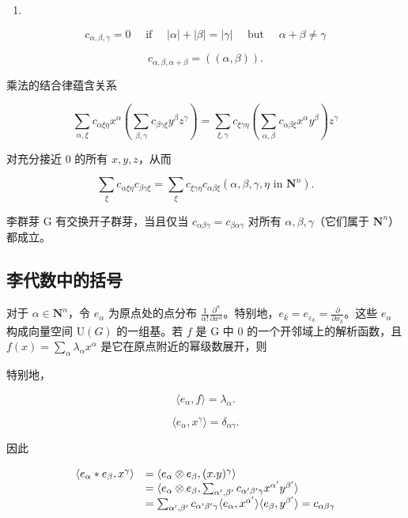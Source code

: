 \begin{enumerate}
\def\labelenumi{(\arabic{enumi})}
\setcounter{enumi}{7}
\tightlist
\item
\end{enumerate}

\[
c _ {\alpha , \beta , \gamma} = 0 \quad \text { if } \quad | \alpha | + | \beta | = | \gamma | \quad \text { but } \quad \alpha + \beta \neq \gamma\tag{8}
\]

\[
c _ {\alpha , \beta , \alpha + \beta} = ((\alpha , \beta)).\tag{9}
\]

乘法的结合律蕴含关系

\[
\sum_ {\alpha , \xi} c _ {\alpha \xi \eta} x ^ {\alpha} \left(\sum_ {\beta , \gamma} c _ {\beta \gamma \xi} y ^ {\beta} z ^ {\gamma}\right) = \sum_ {\xi , \gamma} c _ {\xi \gamma \eta} \left(\sum_ {\alpha , \beta} c _ {\alpha \beta \xi} x ^ {\alpha} y ^ {\beta}\right) z ^ {\gamma}
\]

对充分接近 0 的所有 \(x, y, z\)，从而

\[
\sum_ {\xi} c _ {\alpha \xi \eta} c _ {\beta \gamma \xi} = \sum_ {\xi} c _ {\xi \gamma \eta} c _ {\alpha \beta \xi} (\alpha , \beta , \gamma , \eta \text { in } \mathbf {N} ^ {n}).\tag{10}
\]

李群芽 G 有交换开子群芽，当且仅当 \(c_{\alpha\beta\gamma} = c_{\beta\alpha\gamma}\) 对所有 \(\alpha, \beta, \gamma\)（它们属于 \(\mathbf{N}^{n}\)）都成立。

\subsection{李代数中的括号}

对于 \(\alpha \in \mathbf{N}^n\)，令 \(e_{\alpha}\) 为原点处的点分布 \(\frac{1}{\alpha!} \frac{\partial^{\alpha}}{\partial x^{\alpha}}\)。特别地，\(e_k = e_{\varepsilon_k} = \frac{\partial}{\partial x_k}\)。这些 \(e_{\alpha}\) 构成向量空间 \(\mathrm{U}(G)\) 的一组基。若 \(f\) 是 G 中 0 的一个开邻域上的解析函数，且 \(f(x) = \sum_{\alpha} \lambda_{\alpha} x^{\alpha}\) 是它在原点附近的幂级数展开，则

特别地，

\[
\langle e _ {\alpha}, f \rangle = \lambda_ {\alpha}.
\]

\[
\langle e _ {\alpha}, x ^ {\gamma} \rangle = \delta_ {\alpha \gamma}.
\]

因此

\[
\begin{array}{r l} \langle e _ {\alpha} * e _ {\beta}, x ^ {\gamma} \rangle & = \langle e _ {\alpha} \otimes e _ {\beta}, (x. y) ^ {\gamma} \rangle \\ & = \langle e _ {\alpha} \otimes e _ {\beta}, \sum_ {\alpha^ {\prime}, \beta^ {\prime}} c _ {\alpha^ {\prime} \beta^ {\prime} \gamma} x ^ {\alpha^ {\prime}} y ^ {\beta^ {\prime}} \rangle \\ & = \sum_ {\alpha^ {\prime}, \beta^ {\prime}} c _ {\alpha^ {\prime} \beta^ {\prime} \gamma} \langle e _ {\alpha}, x ^ {\alpha^ {\prime}} \rangle \langle e _ {\beta}, y ^ {\beta^ {\prime}} \rangle = c _ {\alpha \beta \gamma} \end{array}
\]

